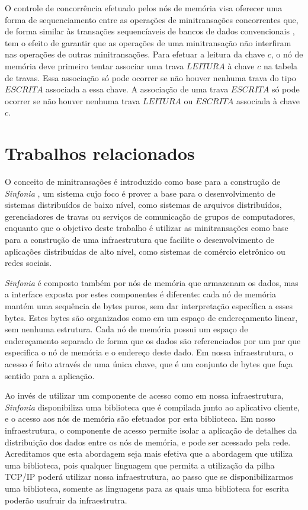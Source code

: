 \documentclass[11pt,twoside,a4paper]{book}
\begin{document}
O controle de concorrência efetuado pelos nós de memória visa oferecer uma forma de sequenciamento entre as operações de minitransações concorrentes que, de forma similar às transações sequencíaveis de bancos de dados convencionais \cite{vaca}, tem o efeito de garantir que as operações de uma minitransação não interfiram nas operações de outras minitransações. Para efetuar a leitura da chave $c$, o nó de memória deve primeiro tentar associar uma trava $LEITURA$ à chave $c$ na tabela de travas. Essa associação só pode ocorrer se não houver nenhuma trava do tipo $ESCRITA$ associada a essa chave. A associação de uma trava $ESCRITA$ só pode ocorrer se não houver nenhuma trava $LEITURA$ ou $ESCRITA$ associada à chave $c$.

\section{Trabalhos relacionados}
\label{sec:trabalhos_relacionados}
O conceito de minitransações é introduzido como base para a construção de \emph{Sinfonia} \cite{sinfonia}, um sistema cujo foco é prover a base para o desenvolvimento de sistemas distribuídos de baixo nível, como sistemas de arquivos distribuídos, gerenciadores de travas ou serviços de comunicação de grupos de computadores, enquanto que o objetivo deste trabalho é utilizar as minitransações como base para a construção de uma infraestrutura que facilite o desenvolvimento de aplicações distribuídas de alto nível, como sistemas de comércio eletrônico ou redes sociais. 

\emph{Sinfonia} é composto também por nós de memória que armazenam os dados, mas a interface exposta por estes componentes é diferente: cada nó de memória mantém uma sequência de bytes puros, sem dar interpretação específica a esses bytes. Estes bytes são organizados como em um espaço de endereçamento linear, sem nenhuma estrutura. Cada nó de memória possui um espaço de endereçamento separado de forma que os dados são referenciados por um par que especifica o nó de memória e o endereço deste dado. Em nossa infraestrutura, o acesso é feito através de uma única chave, que é um conjunto de bytes que faça sentido para a aplicação.

Ao invés de utilizar um componente de acesso como em nossa infraestrutura, \emph{Sinfonia} disponibiliza uma biblioteca que é compilada junto ao aplicativo cliente, e o acesso aos nós de memória são efetuados por esta biblioteca. Em nosso infraestrutura, o componente de acesso permite isolar a aplicação de detalhes da distribuição dos dados entre os nós de memória, e pode ser acessado pela rede. Acreditamos que esta abordagem seja mais efetiva que a abordagem que utiliza uma biblioteca, pois qualquer linguagem que permita a utilização da pilha TCP/IP poderá utilizar nossa infraestrutura, ao passo que se disponibilizarmos uma biblioteca, somente as linguagens para as quais uma biblioteca for escrita poderão usufruir da infraestrutra.
\end{document}
